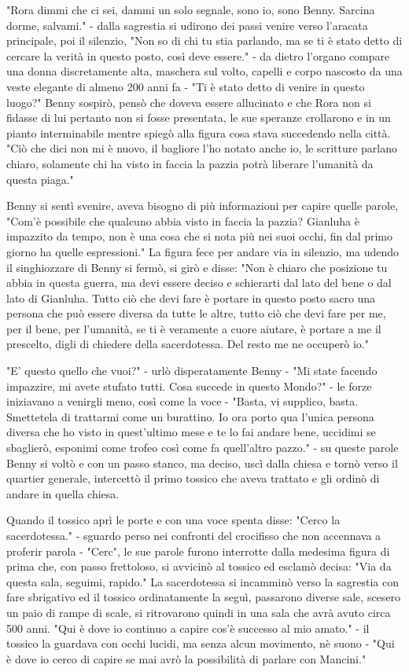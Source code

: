 "Rora dimmi che ci sei, dammi un solo segnale, sono io, sono Benny. Sarcina dorme, salvami." - dalla sagrestia si udirono dei passi venire verso l'aracata principale, poi il silenzio, "Non so di chi tu stia parlando, ma se ti è stato detto di cercare la verità in questo posto, così deve essere." - da dietro l'organo compare una donna discretamente alta, maschera sul volto, capelli e corpo nascosto da una veste elegante di almeno 200 anni fa - "Ti è stato detto di venire in questo luogo?"
Benny sospirò, pensò che doveva essere allucinato e che Rora non si fidasse di lui pertanto non si fosse presentata, le sue speranze crollarono e in un pianto interminabile mentre spiegò alla figura cosa stava succedendo nella città.
"Ciò che dici non mi è nuovo, il bagliore l'ho notato anche io, le scritture parlano chiaro, solamente chi ha visto in faccia la pazzia potrà liberare l'umanità da questa piaga."

Benny si sentì svenire, aveva bisogno di più informazioni per capire quelle parole, "Com'è possibile che qualcuno abbia visto in faccia la pazzia? Gianluha è impazzito da tempo, non è una cosa che si nota più nei suoi occhi, fin dal primo giorno ha quelle espressioni."
La figura fece per andare via in silenzio, ma udendo il singhiozzare di Benny si fermò, si girò e disse: "Non è chiaro che posizione tu abbia in questa guerra, ma devi essere deciso e schierarti dal lato del bene o dal lato di Gianluha. Tutto ciò che devi fare è portare in questo posto sacro una persona che può essere diversa da tutte le altre, tutto ciò che devi fare per me, per il bene, per l'umanità, se ti è veramente a cuore aiutare, è portare a me il prescelto, digli di chiedere della sacerdotessa. Del resto me ne occuperò io."

"E' questo quello che vuoi?" - urlò disperatamente Benny - "Mi state facendo impazzire, mi avete stufato tutti. Cosa succede in questo Mondo?" - le forze iniziavano a venirgli meno, così come la voce - "Basta, vi supplico, basta. Smettetela di trattarmi come un burattino. Io ora porto qua l'unica persona diversa che ho visto in quest'ultimo mese e te lo fai andare bene, uccidimi se sbaglierò, esponimi come trofeo così come fa quell'altro pazzo." - su queste parole Benny si voltò e con un passo stanco, ma deciso, uscì dalla chiesa e tornò verso il quartier generale, intercettò il primo tossico che aveva trattato e gli ordinò di andare in quella chiesa.

Quando il tossico aprì le porte e con una voce spenta disse: "Cerco la sacerdotessa." - sguardo perso nei confronti del crocifisso che non accennava a proferir parola - "Cerc", le sue parole furono interrotte dalla medesima figura di prima che, con passo frettoloso, si avvicinò al tossico ed esclamò decisa: "Via da questa sala, seguimi, rapido."
La sacerdotessa si incamminò verso la sagrestia con fare sbrigativo ed il tossico ordinatamente la seguì, passarono diverse sale, scesero un paio di rampe di scale, si ritrovarono quindi in una sala che avrà avuto circa 500 anni. "Qui è dove io continuo a capire cos'è successo al mio amato." - il tossico la guardava con occhi lucidi, ma senza alcun movimento, nè suono - "Qui è dove io cerco di capire se mai avrò la possibilità di parlare con Mancini."

